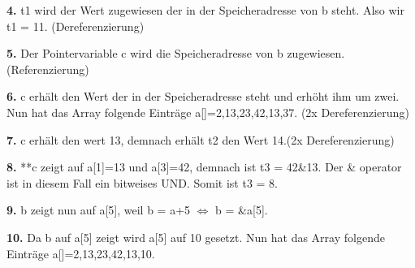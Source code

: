 \documentclass[a4paper,graphics,11pt]{article}
\begin{document}
\textbf{4.} t1 wird der Wert zugewiesen der in der Speicheradresse von b steht. Also wir t1 = 11. (Dereferenzierung)

\textbf{5.} Der Pointervariable c wird die Speicheradresse von b zugewiesen. (Referenzierung)

\textbf{6.} c erhält den Wert der in der Speicheradresse steht und erhöht ihm um zwei. Nun hat das Array folgende Einträge a[]={2,13,23,42,13,37}. (2x Dereferenzierung)

\textbf{7.} c erhält den wert 13, demnach erhält t2 den Wert 14.(2x Dereferenzierung)

\textbf{8.} **c zeigt auf a[1]=13 und a[3]=42, demnach ist t3 = 42\&13. Der \& operator ist in diesem Fall ein bitweises UND. Somit ist t3 = 8.

\textbf{9.} b zeigt nun auf a[5], weil b = a+5 $\Longleftrightarrow$ b = \&a[5].

\textbf{10.} Da b auf a[5] zeigt wird a[5] auf 10 gesetzt. Nun hat das Array folgende Einträge a[]={2,13,23,42,13,10}.
\end{document}
